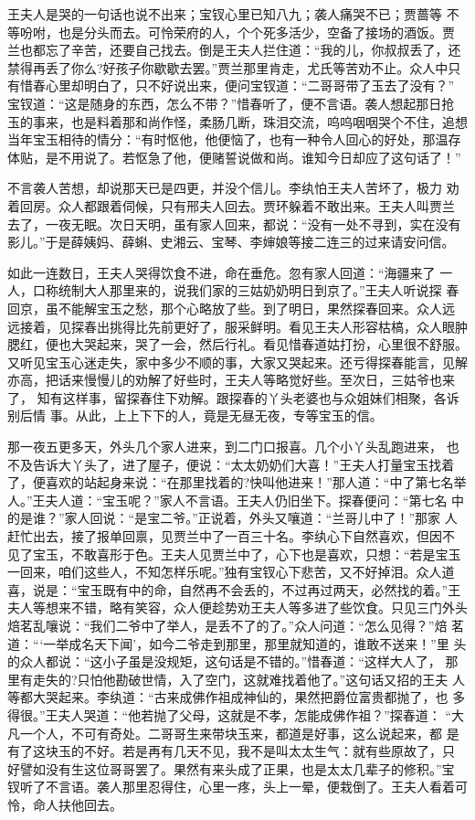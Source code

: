 王夫人是哭的一句话也说不出来；宝钗心里已知八九；袭人痛哭不已；贾蔷等
不等吩咐，也是分头而去。可怜荣府的人，个个死多活少，空备了接场的酒饭。贾
兰也都忘了辛苦，还要自己找去。倒是王夫人拦住道：“我的儿，你叔叔丢了，还
禁得再丢了你么?好孩子你歇歇去罢。”贾兰那里肯走，尤氏等苦劝不止。众人中只
有惜春心里却明白了，只不好说出来，便问宝钗道：“二哥哥带了玉去了没有？”
宝钗道：“这是随身的东西，怎么不带？”惜春听了，便不言语。袭人想起那日抢
玉的事来，也是料着那和尚作怪，柔肠几断，珠泪交流，呜呜咽咽哭个不住，追想
当年宝玉相待的情分：“有时怄他，他便恼了，也有一种令人回心的好处，那温存
体贴，是不用说了。若怄急了他，便赌誓说做和尚。谁知今日却应了这句话了！”

不言袭人苦想，却说那天已是四更，并没个信儿。李纨怕王夫人苦坏了，极力
劝着回房。众人都跟着伺候，只有邢夫人回去。贾环躲着不敢出来。王夫人叫贾兰
去了，一夜无眠。次日天明，虽有家人回来，都说：“没有一处不寻到，实在没有
影儿。”于是薛姨妈、薛蝌、史湘云、宝琴、李婶娘等接二连三的过来请安问信。

如此一连数日，王夫人哭得饮食不进，命在垂危。忽有家人回道：“海疆来了
一人，口称统制大人那里来的，说我们家的三姑奶奶明日到京了。”王夫人听说探
春回京，虽不能解宝玉之愁，那个心略放了些。到了明日，果然探春回来。众人远
远接着，见探春出挑得比先前更好了，服采鲜明。看见王夫人形容枯槁，众人眼肿
腮红，便也大哭起来，哭了一会，然后行礼。看见惜春道姑打扮，心里很不舒服。
又听见宝玉心迷走失，家中多少不顺的事，大家又哭起来。还亏得探春能言，见解
亦高，把话来慢慢儿的劝解了好些时，王夫人等略觉好些。至次日，三姑爷也来了，
知有这样事，留探春住下劝解。跟探春的丫头老婆也与众姐妹们相聚，各诉别后情
事。从此，上上下下的人，竟是无昼无夜，专等宝玉的信。

那一夜五更多天，外头几个家人进来，到二门口报喜。几个小丫头乱跑进来，
也不及告诉大丫头了，进了屋子，便说：“太太奶奶们大喜！”王夫人打量宝玉找着
了，便喜欢的站起身来说：“在那里找着的?快叫他进来！”那人道：“中了第七名举
人。”王夫人道：“宝玉呢？”家人不言语。王夫人仍旧坐下。探春便问：“第七名
中的是谁？”家人回说：“是宝二爷。”正说着，外头又嚷道：“兰哥儿中了！”那家
人赶忙出去，接了报单回禀，见贾兰中了一百三十名。李纨心下自然喜欢，但因不
见了宝玉，不敢喜形于色。王夫人见贾兰中了，心下也是喜欢，只想：“若是宝玉
一回来，咱们这些人，不知怎样乐呢。”独有宝钗心下悲苦，又不好掉泪。众人道
喜，说是：“宝玉既有中的命，自然再不会丢的，不过再过两天，必然找的着。”王
夫人等想来不错，略有笑容，众人便趁势劝王夫人等多进了些饮食。只见三门外头
焙茗乱嚷说：“我们二爷中了举人，是丢不了的了。”众人问道：“怎么见得？”焙
茗道：“‘一举成名天下闻’，如今二爷走到那里，那里就知道的，谁敢不送来！”里
头的众人都说：“这小子虽是没规矩，这句话是不错的。”惜春道：“这样大人了，
那里有走失的?只怕他勘破世情，入了空门，这就难找着他了。”这句话又招的王夫
人等都大哭起来。李纨道：“古来成佛作祖成神仙的，果然把爵位富贵都抛了，也
多得很。”王夫人哭道：“他若抛了父母，这就是不孝，怎能成佛作祖？”探春道：
“大凡一个人，不可有奇处。二哥哥生来带块玉来，都道是好事，这么说起来，都
是有了这块玉的不好。若是再有几天不见，我不是叫太太生气：就有些原故了，只
好譬如没有生这位哥哥罢了。果然有来头成了正果，也是太太几辈子的修积。”宝
钗听了不言语。袭人那里忍得住，心里一疼，头上一晕，便栽倒了。王夫人看着可
怜，命人扶他回去。

